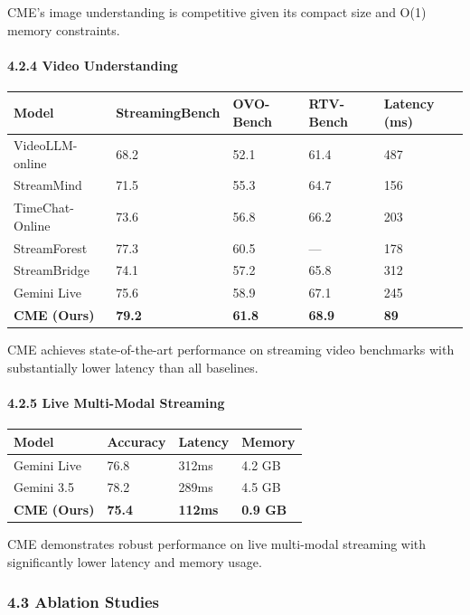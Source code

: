 \documentclass[
  11pt,
  a4paper,
]{article}
\begin{document}
CME's image understanding is competitive given its compact size and O(1)
memory constraints.

\paragraph{4.2.4 Video Understanding}\label{video-understanding}

\begin{longtable}[]{@{}lllll@{}}
\toprule\noalign{}
Model & StreamingBench & OVO-Bench & RTV-Bench & Latency (ms) \\
\midrule\noalign{}
\endhead
\bottomrule\noalign{}
\endlastfoot
VideoLLM-online & 68.2 & 52.1 & 61.4 & 487 \\
StreamMind & 71.5 & 55.3 & 64.7 & 156 \\
TimeChat-Online & 73.6 & 56.8 & 66.2 & 203 \\
StreamForest & 77.3 & 60.5 & --- & 178 \\
StreamBridge & 74.1 & 57.2 & 65.8 & 312 \\
Gemini Live & 75.6 & 58.9 & 67.1 & 245 \\
\textbf{CME (Ours)} & \textbf{79.2} & \textbf{61.8} & \textbf{68.9} &
\textbf{89} \\
\end{longtable}

CME achieves state-of-the-art performance on streaming video benchmarks
with substantially lower latency than all baselines.

\paragraph{4.2.5 Live Multi-Modal
Streaming}\label{live-multi-modal-streaming}

\begin{longtable}[]{@{}llll@{}}
\toprule\noalign{}
Model & Accuracy & Latency & Memory \\
\midrule\noalign{}
\endhead
\bottomrule\noalign{}
\endlastfoot
Gemini Live & 76.8 & 312ms & 4.2 GB \\
Gemini 3.5 & 78.2 & 289ms & 4.5 GB \\
\textbf{CME (Ours)} & \textbf{75.4} & \textbf{112ms} & \textbf{0.9
GB} \\
\end{longtable}

CME demonstrates robust performance on live multi-modal streaming with
significantly lower latency and memory usage.

\subsubsection{4.3 Ablation Studies}\label{ablation-studies}
\end{document}
